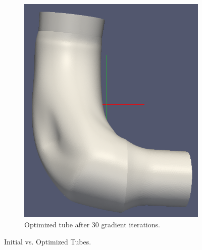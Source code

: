 \documentclass[10pt,xcolor=table,english]{beamer}   %
\begin{document}
\begin{frame}
\begin{figure}
\begin{subfigure}{.49\textwidth}
            \includegraphics[width=.9\linewidth]{tube_iteration_30}  
            \caption{Optimized tube after 30 gradient iterations.}
            \label{fig:sub-third}
        \end{subfigure}
        \caption{Initial vs. Optimized Tubes.}
        \label{fig:fig}
    \end{figure}
\end{frame}
\end{document}
